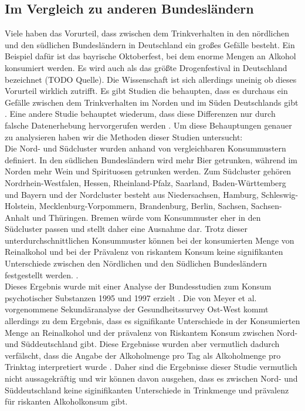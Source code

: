 \documentclass[12pt]{article}
\begin{document}
\subsection{Im Vergleich zu anderen Bundesländern}
Viele haben das Vorurteil, dass zwischen dem Trinkverhalten in den nördlichen und den südlichen Bundesländern in Deutschland ein großes Gefälle besteht. Ein Beispiel dafür ist das bayrische Oktoberfest, bei dem enorme Mengen an Alkohol konsumiert werden. Es wird auch als das größte Drogenfestival in Deutschland bezeichnet (TODO Quelle). Die Wissenschaft ist sich allerdings uneinig ob dieses Vorurteil wirklich zutrifft. Es gibt Studien die behaupten, dass es durchaus ein Gefälle zwischen dem Trinkverhalten im Norden und im Süden Deutschlands gibt \autocite{meyer_regionale_1998}. Eine andere Studie behauptet wiederum, dass diese Differenzen nur durch falsche Datenerhebung hervorgerufen werden \autocite{kraus_einfluss_2001}. Um diese Behauptungen genauer zu analysieren haben wir die Methoden dieser Studien untersucht: \\
Die Nord- und Südcluster wurden anhand von vergleichbaren Konsummustern definiert. In den südlichen Bundesländern wird mehr Bier getrunken, während im Norden mehr Wein und Spirituosen getrunken werden. Zum Südcluster gehören Nordrhein-Westfalen, Hessen, Rheinland-Pfalz, Saarland, Baden-Württemberg und Bayern und der Nordcluster besteht aus Niedersachsen, Hamburg, Schleswig-Holstein, Mecklenburg-Vorpommern, Brandenburg, Berlin, Sachsen, Sachsen-Anhalt und Thüringen. Bremen würde vom Konsummuster eher in den Südcluster passen und stellt daher eine Ausnahme dar. Trotz dieser unterdurchschnittlichen Konsummuster können bei der konsumierten Menge von Reinalkohol und bei der Prävalenz von riskantem Konsum keine signifikanten Unterschiede zwischen den Nördlichen und den Südlichen Bundesländern festgestellt werden. \autocite{kraus_einfluss_2001}.\\
Dieses Ergebnis wurde mit einer Analyse der Bundesstudien zum Konsum psychotischer Substanzen 1995 und 1997 erzielt \autocite{kraus_einfluss_2001}. Die von Meyer et al. \autocite{meyer_regionale_1998} vorgenommene Sekundäranalyse der Gesundheitssurvey Ost-West kommt allerdings zu dem Ergebnis, dass es signifikante Unterschiede in der Konsumierten Menge an Reinalkohol und der prävalenz von Riskantem Konsum zwischen Nord- und Süddeutschland gibt. Diese Ergebnisse wurden aber vermutlich dadurch verfälscht, dass die Angabe der Alkoholmenge pro Tag als Alkoholmenge pro Trinktag interpretiert wurde \autocite{kraus_einfluss_2001}. Daher sind die Ergebnisse dieser Studie vermutlich nicht aussagekräftig und wir können davon ausgehen, dass es zwischen Nord- und Süddeutschland keine siginifikanten Unterschiede in Trinkmenge und prävalenz für riskanten Alkoholkonsum gibt.
\end{document}
